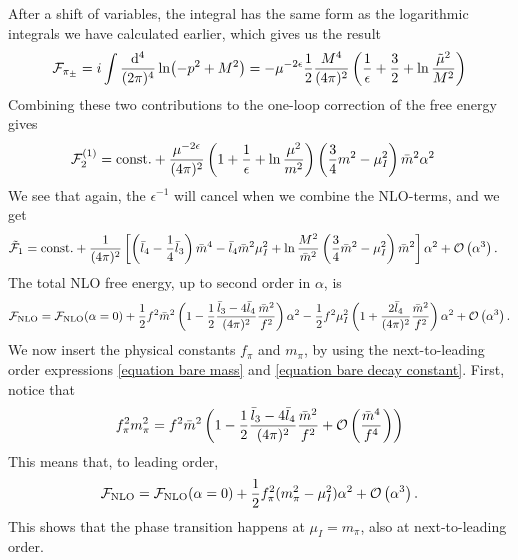 After a shift of variables, the integral has the same form as the logarithmic integrals we have calculated earlier, which gives us the result
\begin{equation}
    \Ef_{\pi_\pm}
    = i \int \frac{\dd^4}{(2\pi)^4}
    \ln(-p^2 + M^2)
    = 
    - \mu^{-2\epsilon}\frac{1}{2} \frac{M^4}{(4 \pi)^2}
    \left(\frac{1}{\epsilon} + \frac{3}{2} + \ln \frac{\tilde \mu^2}{M^2}\right)
\end{equation}
Combining these two contributions to the one-loop correction of the free energy gives
\begin{align*}
    \Ef_2^{(1)}
    &=
    \mathrm{const.}
    +
    \frac{\mu^{-2 \epsilon } }{(4 \pi)^2} 
    \left(1 + \frac{1}{\epsilon} + \ln \frac{\mu^2}{m^2}\right)
    \left(\frac{3}{4}m^2 - \mu_I^2\right)
    \bar m^2 \alpha^2
\end{align*}
We see that again, the $\epsilon^{-1}$ will cancel when we combine the NLO-terms, and we get
\begin{align}
    \tilde \Ef_1
    & = 
    \const+ 
    \frac{1}{(4\pi)^2}
    \left[
        \left(
            \bar l_4 - \frac{1}{4}\bar l_3
        \right)\bar m^4
        -\bar l_4\bar m^2\mu_I^2
        + \ln\frac{M^2}{\bar m^2}
        \left(\frac{3}{4}\bar m^2 - \mu_I^2\right)\bar m^2
    \right]\alpha^2
    + \Oh[3]{\alpha}.
\end{align}
The total NLO free energy, up to second order in $\alpha$, is
\begin{equation}
    \Ef_{\mathrm{NLO}}
    =
    \Ef_{\mathrm{NLO}}(\alpha = 0)
    +
    \frac{1}{2} f^2 \bar m^2
    \left(
        1
        -
        \frac{1}{2}
        \frac{\bar l_3 - 4 \bar l_4}{(4 \pi)^2} \frac{\bar m^2}{f^2}
    \right)\alpha^2
    - \frac{1}{2}f^2 \mu_I^2
    \left(
        1
        +
        \frac{2 \bar l_4}{(4 \pi)^2}
        \frac{\bar m^2}{f^2}
    \right) \alpha^2
    + \Oh[3]{\alpha}.
\end{equation}
We now insert the physical constants $f_\pi$ and $m_\pi$, by using the next-to-leading order expressions \cref{equation bare mass} and \cref{equation bare decay constant}.
First, notice that
\begin{equation}
    f_\pi^2 m_\pi^2
    = f^2 \bar m^2
    \left(
        1 - \frac{1}{2} \frac{\bar l_3 - 4 \bar l_4}{(4 \pi)^2} \frac{\bar m^2}{f^2}
        +
        \Oh[]{\frac{\bar m^4}{f^4}}
    \right)
\end{equation}
This means that, to leading order,
\begin{equation}
    \Ef_{\mathrm{NLO}}
    =
    \Ef_{\mathrm{NLO}}(\alpha = 0)
    + \frac{1}{2}f_\pi^2 (m_\pi^2 - \mu_I^2 )\alpha^2
    + \Oh[3]{\alpha}.
\end{equation}
This shows that the phase transition happens at $\mu_I = m_\pi$, also at next-to-leading order.
